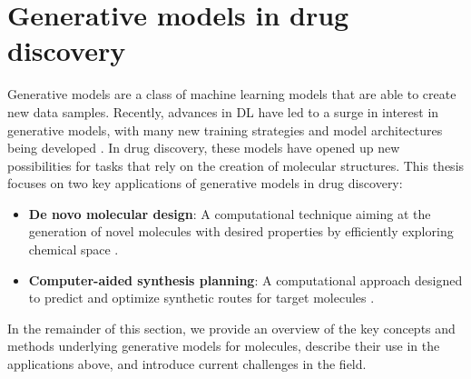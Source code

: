 \section{Generative models in drug discovery}
Generative models are a class of machine learning models that are able to create new data samples.
Recently, advances in \ac{DL} have led to a surge in interest in generative models, with many new
training strategies and model architectures being developed
\citep{bond-taylorDeepGenerativeModelling2022,brownLanguageModelsAre2020,goodfellowGenerativeAdversarialNets2014,
	dinhDensityEstimationUsing2017,kingmaAutoEncodingVariationalBayes2013,hoDenoisingDiffusionProbabilistic2020,vaswaniAttentionAllYou2017}.
In drug discovery, these models have opened up new possibilities for tasks that rely on the creation
of molecular structures. This thesis focuses on two key applications of generative models in
drug discovery:
\begin{itemize}
	\item \textbf{De novo molecular design}: A computational technique aiming at the generation of
	      novel molecules with desired properties by efficiently exploring chemical space
	      \citep{schneiderNovoMolecularDesign2013,sanchez-lengelingInverseMolecularDesign2018,ekinsIntroductionGenerativeDrug2025}.
	\item \textbf{Computer-aided synthesis planning}: A computational approach designed to predict and optimize synthetic routes for
	      target molecules \citep{coreyComputerAssistedDesignComplex1969}.
\end{itemize}

In the remainder of this section, we provide an overview of the key concepts and methods underlying
generative models for molecules, describe their use in the applications above, and introduce current
challenges in the field.

